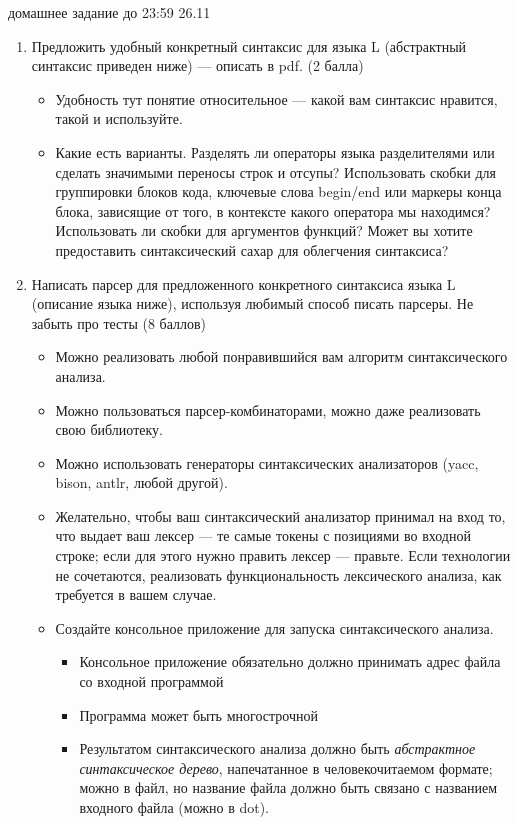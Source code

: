 \documentclass{article}
\begin{document}

{\Large домашнее задание до 23:59 26.11}
\bigskip
\begin{enumerate}
  \item Предложить удобный конкретный синтаксис для языка L (абстрактный синтаксис приведен ниже) --- описать в pdf. (2 балла)
  \begin{itemize}
    \item Удобность тут понятие относительное --- какой вам синтаксис нравится, такой и используйте.
    \item Какие есть варианты. Разделять ли операторы языка разделителями или сделать значимыми переносы строк и отсупы? Использовать скобки для группировки блоков кода, ключевые слова begin/end или маркеры конца блока, зависящие от того, в контексте какого оператора мы находимся? Использовать ли скобки для аргументов функций? Может вы хотите предоставить синтаксический сахар для облегчения синтаксиса? 
  \end{itemize}
  \item Написать парсер для предложенного конкретного синтаксиса языка L (описание языка ниже), используя любимый способ писать парсеры. Не забыть про тесты (8 баллов)
    \begin{itemize}
        \item Можно реализовать любой понравившийся вам алгоритм синтаксического анализа.
        \item Можно пользоваться парсер-комбинаторами, можно даже реализовать свою библиотеку.
        \item Можно использовать генераторы синтаксических анализаторов (yacc, bison, antlr, любой другой).
        \item Желательно, чтобы ваш синтаксический анализатор принимал на вход то, что выдает ваш лексер --- те самые токены с позициями во входной строке; если для этого нужно править лексер --- правьте. Если технологии не сочетаются, реализовать функциональность лексического анализа, как требуется в вашем случае.
        \item Создайте консольное приложение для запуска синтаксического анализа.
        \begin{itemize}
            \item Консольное приложение обязательно должно принимать адрес файла со входной программой
            \item Программа может быть многострочной
            \item Результатом синтаксического анализа должно быть \emph{абстрактное синтаксическое дерево}, напечатанное в человекочитаемом формате; можно в файл, но название файла должно быть связано с названием входного файла (можно в dot).

\end{itemize}
\end{itemize}
\end{enumerate}
\end{document}
